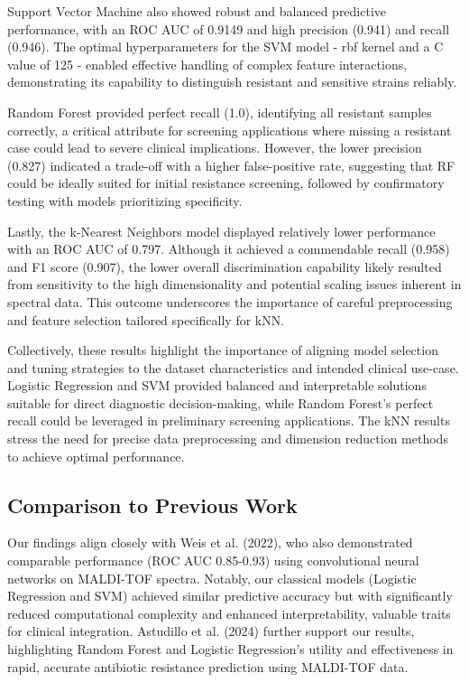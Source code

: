 \documentclass{article}
\begin{document}
Support Vector Machine also showed robust and balanced predictive performance, with an ROC AUC of 0.9149 and high precision (0.941) and recall (0.946). The optimal hyperparameters for the SVM model - rbf kernel and a C value of 125 - enabled effective handling of complex feature interactions, demonstrating its capability to distinguish resistant and sensitive strains reliably.

Random Forest provided perfect recall (1.0), identifying all resistant samples correctly, a critical attribute for screening applications where missing a resistant case could lead to severe clinical implications. However, the lower precision (0.827) indicated a trade-off with a higher false-positive rate, suggesting that RF could be ideally suited for initial resistance screening, followed by confirmatory testing with models prioritizing specificity.

Lastly, the k-Nearest Neighbors model displayed relatively lower performance with an ROC AUC of 0.797. Although it achieved a commendable recall (0.958) and F1 score (0.907), the lower overall discrimination capability likely resulted from sensitivity to the high dimensionality and potential scaling issues inherent in spectral data. This outcome underscores the importance of careful preprocessing and feature selection tailored specifically for kNN.

Collectively, these results highlight the importance of aligning model selection and tuning strategies to the dataset characteristics and intended clinical use-case. Logistic Regression and SVM provided balanced and interpretable solutions suitable for direct diagnostic decision-making, while Random Forest's perfect recall could be leveraged in preliminary screening applications. The kNN results stress the need for precise data preprocessing and dimension reduction methods to achieve optimal performance.

\subsection{Comparison to Previous Work}

Our findings align closely with Weis et al. (2022), who also demonstrated comparable performance (ROC AUC 0.85-0.93) using convolutional neural networks on MALDI-TOF spectra. Notably, our classical models (Logistic Regression and SVM) achieved similar predictive accuracy but with significantly reduced computational complexity and enhanced interpretability, valuable traits for clinical integration. Astudillo et al. (2024) further support our results, highlighting Random Forest and Logistic Regression's utility and effectiveness in rapid, accurate antibiotic resistance prediction using MALDI-TOF data.
\end{document}
